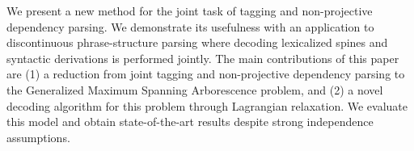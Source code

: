 We present a new method for the joint task of tagging and non-projective dependency parsing. We demonstrate its usefulness with an application to discontinuous phrase-structure parsing where decoding lexicalized spines and syntactic derivations is performed jointly. The main contributions of this paper are (1) a reduction from joint tagging and non-projective dependency parsing to the Generalized Maximum Spanning Arborescence problem, and (2) a novel decoding algorithm for this problem through Lagrangian relaxation. We evaluate this model and obtain state-of-the-art results despite strong independence assumptions.
